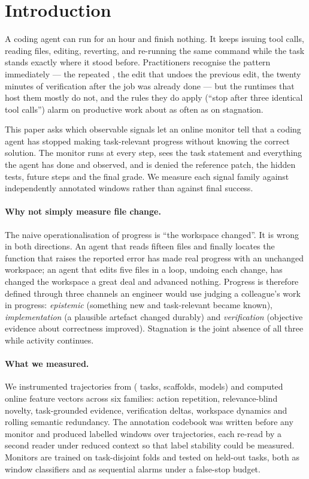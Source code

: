 \section{Introduction}

A coding agent can run for an hour and finish nothing. It keeps issuing tool calls, reading files, editing,
reverting, and re-running the same command while the task stands exactly where it stood before.
Practitioners recognise the pattern immediately --- the repeated , the edit that undoes the
previous edit, the twenty minutes of verification after the job was already done --- but the runtimes that
host them mostly do not, and the rules they do apply (``stop after three identical tool calls'') alarm on
productive work about as often as on stagnation.

This paper asks which observable signals let an online monitor tell that a coding agent has stopped making
task-relevant progress without knowing the correct solution. The monitor runs at every step, sees the task
statement and everything the agent has done and observed, and is denied the reference patch, the hidden
tests, future steps and the final grade. We measure each signal family against independently annotated
windows rather than against final success.

\paragraph{Why not simply measure file change.}
The naive operationalisation of progress is ``the workspace changed''. It is wrong in both directions. An
agent that reads fifteen files and finally locates the function that raises the reported error has made real
progress with an unchanged workspace; an agent that edits five files in a loop, undoing each change, has
changed the workspace a great deal and advanced nothing. Progress is therefore defined through three
channels an engineer would use judging a colleague's work in progress: \emph{epistemic} (something new and
task-relevant became known), \emph{implementation} (a plausible artefact changed durably) and
\emph{verification} (objective evidence about correctness improved). Stagnation is the joint absence of all
three while activity continues.

\paragraph{What we measured.}
We instrumented \pnTraj{} trajectories from \pcorpusName{} (\pnTasks{} tasks, \pcorpusScaffolds{} scaffolds,
\pcorpusModels{} models) and computed \pnWindows{} online feature vectors across six families: action
repetition, relevance-blind novelty, task-grounded evidence, verification deltas, workspace dynamics and
rolling semantic redundancy. The annotation codebook was written before any monitor and produced
\pannWindowsTotal{} labelled windows over \pannTrajTotal{} trajectories, each re-read by a second reader
under reduced context so that label stability could be measured. Monitors are trained on task-disjoint
folds and tested on held-out tasks, both as window classifiers and as sequential alarms under a false-stop
budget.

